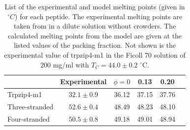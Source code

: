 \begin{table}
\begin{tabular}{l|c|c|c|c|c}             
                          & Experimental    & $\phi=0$ & 0.13  & 0.20  \\ \hline
Trpzip4-m1                & $32.1 \pm 0.9$  & 36.12    & 37.15 & 37.76 \\
Three-stranded            & $52.6 \pm 0.4$  & 48.49    & 48.23 & 48.10 \\
Four-stranded             & $50.5 \pm 0.8$  & 49.18    & 49.01 & 48.94 \\
\end{tabular}
\caption{List of the experimental and model melting points (given in $^\circ C$) for each peptide. The experimental melting points are taken from \cite{xu_probing_2008, mukherjee_effect_2009, du_understanding_2006} in a dilute solution without crowders. The calculated melting points from the model are given at the listed values of the packing fraction. Not shown is the experimental value of trpzip4-m1 in the Ficoll 70 solution of $200$ mg/ml with $T_C=44.0 \pm 0.2$ $^\circ$C.}
\label{table:melting_points}
\end{table}

